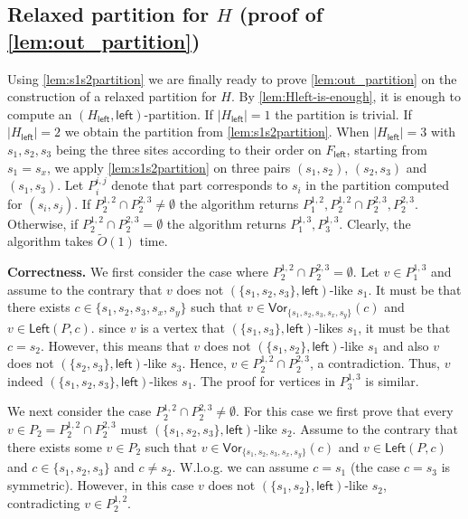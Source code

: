 \documentclass{article}
\newcommand{\Left}{\mathsf{Left}}
\newcommand{\leftside}{\mathsf{left}}
\newcommand{\Vor}{\textsf{Vor}}
\newcommand{\Otild}{\tilde{O}}
\begin{document}
\subsection{Relaxed partition for $H$ (proof of \cref{lem:out_partition})}\label{sec:H-partition}


Using \cref{lem:s1s2partition} we are finally ready to prove \cref{lem:out_partition} on the construction of a relaxed partition for $H$.
By \cref{lem:Hleft-is-enough}, it is enough to compute an $(H_{\leftside},\leftside)$-partition.
If $|H_{\leftside}|=1$ the partition is trivial. If $|H_{\leftside}|=2$ we obtain the partition from \cref{lem:s1s2partition}.
When $|H_{\leftside}|=3$ with $s_1,s_2,s_3$ being the three sites according to their order on $F_{\leftside}$, starting from $s_1 = s_x$, we apply \cref{lem:s1s2partition} on three pairs $(s_1,s_2)$, $(s_2,s_3)$ and $(s_1,s_3)$.
Let $P_i^{i,j}$ denote that part corresponds to $s_i$ in the partition computed for $(s_i,s_j)$.
If $P^{1,2}_2\cap P^{2,3}_2\ne\emptyset$ the algorithm returns $P^{1,2}_1,P^{1,2}_2\cap P^{2,3}_2,P^{2,3}_2$.
Otherwise, if $P^{1,2}_2\cap P^{2,3}_2=\emptyset$  the algorithm returns $P^{1,3}_1,P^{1,3}_3$.
Clearly, the algorithm takes $\Otild(1)$ time.

\medskip
\noindent
{\bf Correctness.}
We first consider the case where $P^{1,2}_2\cap P^{2,3}_2=\emptyset$.
Let $v\in P^{1,3}_1$ and assume to the contrary that $v$ does not $(\{s_1,s_2,s_3\},\leftside)$-like $s_1$.
It must be that there exists $c\in\{s_1,s_2,s_3,s_x,s_y\}$ such that $v\in\Vor_{\{s_1,s_2,s_3,s_x,s_y\}}(c)$ and $v\in\Left(P,c)$.
since $v$ is a vertex that $(\{s_1,s_3\},\leftside)$-likes $s_1$, it must be that $c=s_2$.
However, this means that $v$ does not $(\{s_1,s_2\},\leftside)$-like $s_1$ and also $v$ does not $(\{s_2,s_3\},\leftside)$-like $s_3$.
Hence, $v\in P^{1,2}_2\cap P^{2,3}_2$, a contradiction.
Thus, $v$ indeed $(\{s_1,s_2,s_3\},\leftside)$-likes $s_1$.
The proof for vertices in $P^{1,3}_3$ is similar.

We next consider the case $P^{1,2}_2\cap P^{2,3}_2\ne \emptyset$.
For this case we first prove that every $v\in P_2=P^{1,2}_2\cap P^{2,3}_2$ must $(\{s_1,s_2,s_3\},\leftside)$-like $s_2$.
Assume to the contrary that there exists some $v\in P_2$ such that $v\in\Vor_{\{s_1,s_2,s_3,s_x,s_y\}}(c)$ and $v\in\Left(P,c)$ and $c\in\{s_1,s_2,s_3\}$ and $c\ne s_2$.
W.l.o.g. we can assume $c=s_1$ (the case $c=s_3$ is symmetric).
However, in this case $v$ does not $(\{s_1,s_2\},\leftside)$-like $s_2$, contradicting $v\in P^{1,2}_2$.
\end{document}

